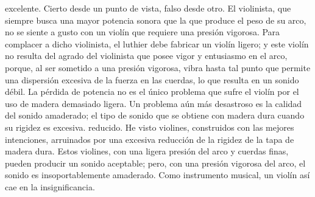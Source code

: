 excelente.
Cierto desde un punto de vista, falso desde otro. El violinista, que siempre busca una mayor potencia sonora que la que produce el peso de su arco, no se siente a gusto con un violín que requiere una presión vigorosa. Para complacer a dicho violinista, el luthier debe fabricar un violín ligero; y este violín no resulta del agrado del violinista que posee vigor y entusiasmo en el arco, porque, al ser sometido a una presión vigorosa, vibra hasta tal punto que permite una dispersión excesiva de la fuerza en las cuerdas, lo que resulta en un sonido débil.
La pérdida de potencia no es el único problema que sufre el violín por el uso de madera demasiado ligera. Un problema aún más desastroso es la calidad del sonido amaderado; el tipo de sonido que se obtiene con madera dura cuando su rigidez es excesiva.
reducido.
He visto violines, construidos con las mejores intenciones, arruinados por una excesiva reducción de la rigidez de la tapa de madera dura. Estos violines, con una ligera presión del arco y cuerdas finas, pueden producir un sonido aceptable; pero, con una presión vigorosa del arco, el sonido es insoportablemente amaderado. Como instrumento musical, un violín así cae en la insignificancia.
